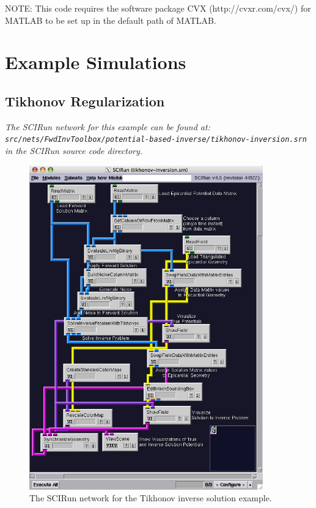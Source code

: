 NOTE: This code requires the software package CVX (http://cvxr.com/cvx/) for MATLAB to be set up in the default path of MATLAB.

\section{Example Simulations}

\subsection{Tikhonov Regularization}

\vspace{5pt}\textit{The SCIRun network for this example can be found at:\\{\tt src/nets/FwdInvToolbox/potential-based-inverse/tikhonov-inversion.srn}\\in the SCIRun source code directory.}\vspace{5pt}

\begin{figure}[H]
\begin{center}
\includegraphics[width=0.9\textwidth]{ECGToolkitGuide_figures/TikhonovNetwork.png}
\caption{The SCIRun network for the Tikhonov inverse solution example.}
\label{TikhonovNetworkExample}
\end{center}
\end{figure}

